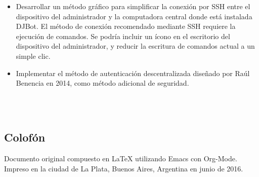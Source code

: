 \documentclass[a4paper,12pt]{article}
\begin{document}
\begin{itemize}
\item Desarrollar un método gráfico para simplificar la conexión por SSH entre el dispositivo del administrador y la computadora central donde está instalada DJBot. El método de conexión recomendado mediante SSH requiere la ejecución de comandos. Se podría incluir un ícono en el escritorio del dispositivo del administrador, y reducir la escritura de comandos actual a un simple clic.\\

\item Implementar el método de autenticación descentralizada diseñado por Raúl Benencia en 2014, como método adicional de seguridad.\\
\end{itemize}

\nocite{*}

\renewcommand\refname{Bibliografía}
\\
\\

\newpage
\thispagestyle{empty}
\hfill
\vfill

\begin{center}
\newcommand{\latex}{\LaTeX\xspace}
\section*{Colofón}
Documento original compuesto en \latex utilizando Emacs con Org-Mode.
\bigskip
Impreso en la ciudad de La Plata, Buenos Aires, Argentina en junio de 2016.

\end{center}
\bigskip
\end{document}
